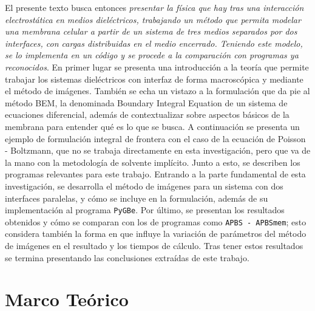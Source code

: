 \documentclass[12pt, oneside, numbers, spanish]{ezthesis}
\numberwithin{equation}{section}
\begin{document}
El presente texto busca entonces \textit{presentar la física que hay tras una interacción electrostática en medios dieléctricos, trabajando un método que permita modelar una membrana celular a partir de un sistema de tres medios separados por dos interfaces, con cargas distribuidas en el medio encerrado. Teniendo este modelo, se lo implementa en un código y se procede a la comparación con programas ya reconocidos}.
En primer lugar se presenta una introducción a la teoría que permite trabajar los sistemas dieléctricos con interfaz de forma macroscópica y mediante el método de imágenes. También se echa un vistazo a la formulación que da pie al método BEM, la denominada Boundary Integral Equation de un sistema de ecuaciones diferencial, además de contextualizar sobre aspectos básicos de la membrana para entender qué es lo que se busca. A continuación se presenta un ejemplo de formulación integral de frontera con el caso de la ecuación de Poisson - Boltzmann, que no se trabaja directamente en esta investigación, pero que va de la mano con la metodología de solvente implícito. Junto a esto, se describen los programas relevantes para este trabajo. Entrando a la parte fundamental de esta investigación, se desarrolla el método de imágenes para un sistema con dos interfaces paralelas, y cómo se incluye en la formulación, además de su implementación al programa \texttt{PyGBe}. Por último, se presentan los resultados obtenidos y cómo se comparan con los de programas como \texttt{APBS - APBSmem}; esto considera también la forma en que influye la variación de parámetros del método de imágenes en el resultado y los tiempos de cálculo. Tras tener estos resultados se termina presentando las conclusiones extraídas de este trabajo.




\chapter{Marco Teórico}\label{Chap:Teoria}
\end{document}
